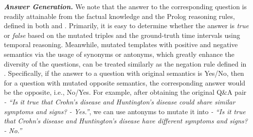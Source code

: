 \textbf{\emph{Answer Generation.}}
We note that the answer to the corresponding question is readily attainable from the factual knowledge and the Prolog reasoning rules, defined in both  and . 
Primarily, it is easy to determine whether the answer is \emph{true} or \emph{false} based on the mutated triples and the ground-truth time intervals using temporal reasoning. 
Meanwhile, mutated templates with positive and negative semantics via the usage of synonyms or antonyms, which greatly enhance the diversity of the questions, can be treated similarly as the negation rule defined in . 
Specifically, if the answer to a question with original semantics is Yes/No, then for a question with mutated opposite semantics, the corresponding answer would %
be the opposite, i.e., No/Yes. For example, after obtaining the original Q\&A pair \textit{- ``Is it true that Crohn's disease and Huntington's disease could share similar symptoms and signs? - Yes.''}, we can use antonyms to mutate it into \textit{- ``Is it true that Crohn's disease and Huntington's disease have different symptoms and signs? - No.''}







